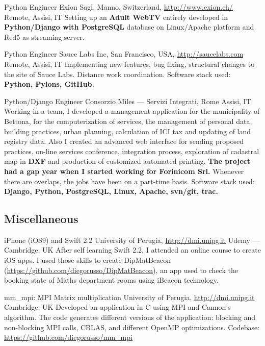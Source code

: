 \documentclass[10pt,a4paper,sans]{moderncv}
\begin{document}
    {Python Engineer}
    {Exion Sagl, Manno, Switzerland, \url{http://www.exion.ch/}}
    {Remote, Assisi, IT}{}
    {Setting up an \textbf{Adult WebTV} entirely developed in
    \textbf{Python/Django with PostgreSQL} database on Linux/Apache platform
    and Red5 as streaming server.}

    {Python Engineer}
    {Sauce Labs Inc, San Francisco, USA, \url{http://saucelabs.com}}
    {Remote, Assisi, IT}{}
    {Implementing new features, bug fixing, structural changes to the site of
    Sauce Labs. Distance work coordination. Software stack used:
    \textbf{Python, Pylons, GitHub.}}

    {Python/Django Engineer}
    {Consorzio Miles --- Servizi Integrati, Rome}
    {Assisi, IT}{}
    {Working in a team, I developed a management application for the
    municipality of Bettona, for the computerization of services, the
    management of personal data, building practices, urban planning,
    calculation of ICI tax and updating of land registry data. Also I created
    an advanced web interface for sending proposed practices, on-line services
    conference, integration process, exploration of cadastral map in
    \textbf{DXF} and production of customized automated printing.
    \textbf{The project had a gap year when I started working for Forinicom
    Srl.} Whenever there are overlaps, the jobs have been on a part-time
    basis.
    Software stack used: \textbf{Django, Python, PostgreSQL, Linux, Apache,
    svn/git, trac.}}

\subsection{Miscellaneous}
    {iPhone (iOS9) and Swift 2.2}
    {University of Perugia, \url{http://dmi.unipg.it}}
    {Udemy --- Cambridge, UK}{}
    {After self learning Swift 2.2, I attended an online course to create iOS
    apps. I used those skills to create DipMatBeacon
    (\url{https://github.com/diegorusso/DipMatBeacon}), an app used to check
    the booking state of Maths department rooms using iBeacon technology.}

    {mm\_mpi: MPI Matrix multiplication}
    {University of Perugia, \url{http://dmi.unipg.it}}
    {Cambridge, UK}{}
    {Developed an application in C using MPI and Cannon's algorithm. The code
    generates different versions of the application: blocking and non-blocking
    MPI calls, CBLAS, and different OpenMP optimizations. Codebase:
    \url{https://github.com/diegorusso/mm\_mpi}}
\end{document}
